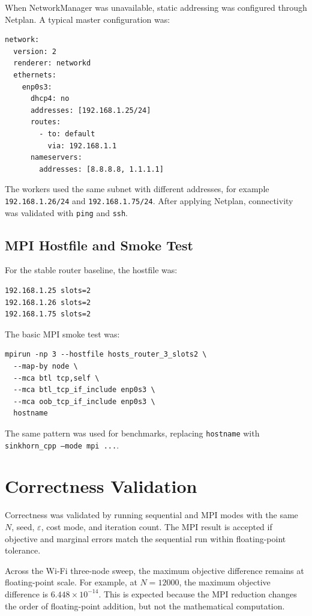 \documentclass[12pt,a4paper]{article}
\begin{document}
When NetworkManager was unavailable, static addressing was configured through Netplan. A typical master configuration was:

\begin{verbatim}
network:
  version: 2
  renderer: networkd
  ethernets:
    enp0s3:
      dhcp4: no
      addresses: [192.168.1.25/24]
      routes:
        - to: default
          via: 192.168.1.1
      nameservers:
        addresses: [8.8.8.8, 1.1.1.1]
\end{verbatim}

The workers used the same subnet with different addresses, for example \texttt{192.168.1.26/24} and \texttt{192.168.1.75/24}. After applying Netplan, connectivity was validated with \texttt{ping} and \texttt{ssh}.

\subsection{MPI Hostfile and Smoke Test}

For the stable router baseline, the hostfile was:

\begin{verbatim}
192.168.1.25 slots=2
192.168.1.26 slots=2
192.168.1.75 slots=2
\end{verbatim}

The basic MPI smoke test was:

\begin{verbatim}
mpirun -np 3 --hostfile hosts_router_3_slots2 \
  --map-by node \
  --mca btl tcp,self \
  --mca btl_tcp_if_include enp0s3 \
  --mca oob_tcp_if_include enp0s3 \
  hostname
\end{verbatim}

The same pattern was used for benchmarks, replacing \texttt{hostname} with \texttt{sinkhorn\_cpp --mode mpi ...}.

\section{Correctness Validation}

Correctness was validated by running sequential and MPI modes with the same $N$, seed, $\varepsilon$, cost mode, and iteration count. The MPI result is accepted if objective and marginal errors match the sequential run within floating-point tolerance.

Across the Wi-Fi three-node sweep, the maximum objective difference remains at floating-point scale. For example, at $N=12000$, the maximum objective difference is $6.448\times 10^{-14}$. This is expected because the MPI reduction changes the order of floating-point addition, but not the mathematical computation.
\end{document}
